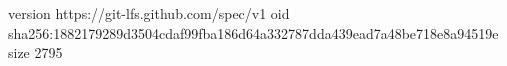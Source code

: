 version https://git-lfs.github.com/spec/v1
oid sha256:1882179289d3504cdaf99fba186d64a332787dda439ead7a48be718e8a94519e
size 2795
